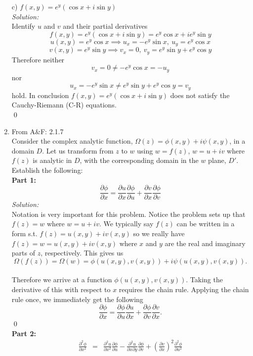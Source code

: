 \documentclass[10pt]{amsart}
\theoremstyle{nonumberplain}
\begin{document}
\begin{enumerate}[label={\bf {\arabic*}:}]
\noindent
c) $f(x, y) = e^y(\cos x + i\sin y)$ \\
\textit{Solution:} \\
Identify $u$ and $v$ and their partial derivatives
$$ f(x, y) = e^y(\cos x + i\sin y) = e^y\cos x + ie^y\sin y $$
$$ u(x,y) = e^y\cos x \implies u_x = -e^y \sin x, \: u_y = e^y\cos x $$
$$ v(x,y) = e^y\sin y \implies v_x = 0, \: v_y = e^y\sin y + e^y \cos y $$
Therefore neither
$$v_x = 0 \neq - e^y\cos x = - u_y$$ nor $$u_x = -e^y \sin x \neq e^y\sin y + e^y \cos y = v_y$$ hold.
In conclusion $f(x, y) = e^y(\cos x + i\sin y)$ does not satisfy the Cauchy-Riemann (C-R) equations. \\
\qed
\item From A\&F: 2.1.7 \\
Consider the complex analytic function, $\Omega(z) = \phi(x, y) + i\psi(x, y)$, in a domain $D$.
Let us transform from $z$ to $w$ using $w = f(z)$, $w = u + iv$ where $f(z)$ is analytic in $D$, with the corresponding domain in the $w$ plane, $D'$.
Establish the following: \\
\textbf{Part 1:}
$$
\frac{\partial\phi}{\partial x} = \frac{\partial u}{\partial x} \frac{\partial\phi}{\partial u} + \frac{\partial v}{\partial x} \frac{\partial\phi}{\partial v}
$$
\textit{Solution:}\\
Notation is very important for this problem. 
Notice the problem sets up that $f(z) = w$ where $w = u + iv$.
We typically say $f(z)$ can be written in a form s.t. $f(z) = u(x,y) + iv(x, y)$ so we really have $f(z) = w = u(x,y) + iv(x,y)$ where $x$ and $y$ are the real and imaginary parts of $z$, respectively.
This gives us \\
$$
\Omega(f(z)) = \Omega(w) = \phi(u(x, y), v(x, y)) + i\psi(u(x, y), v(x, y)).
$$ \\
Therefore we arrive at a function $\phi(u(x, y), v(x, y))$.
Taking the derivative of this with respect to $x$ requires the chain rule.
Applying the chain rule once, we immediately get the following \\
$$\frac{\partial\phi}{\partial x} = \frac{\partial\phi}{\partial u} \frac{\partial u}{\partial x} + \frac{\partial\phi}{\partial v} \frac{\partial v}{\partial x}.$$
\qed \\
\textbf{Part 2:}
\begin{eqnarray*}
\frac{\partial^2\phi}{\partial x^2} &=& \frac{\partial^2 u}{\partial x^2} \frac{\partial\phi}{\partial u}
							- \frac{\partial^2 u}{\partial x \partial y} \frac{\partial\phi}{\partial v}
							+ \left(\frac{\partial v}{\partial x}\right)^2 \frac{\partial^2 \phi}{\partial u^2}

\end{eqnarray*}
\end{enumerate}
\end{document}
